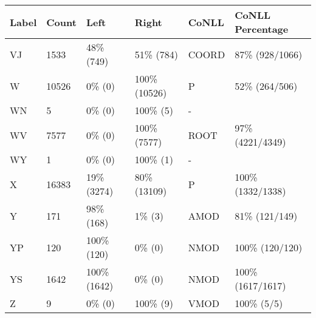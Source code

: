 \begin{figure*}
\begin{tabular}{|l|l|l|l||l|l|}
\hline
Label & Count & Left & Right & CoNLL & CoNLL Percentage\\ 
\hline
 VJ & 1533 & 48\% (749) & 51\% (784) & COORD & 87\% (928/1066) \\ 
\hline
 W & 10526 & 0\% (0) & 100\% (10526) & P & 52\% (264/506) \\ 
\hline
 WN & 5 & 0\% (0) & 100\% (5) & - &  \\ 
\hline
 WV & 7577 & 0\% (0) & 100\% (7577) & ROOT & 97\% (4221/4349) \\ 
\hline
 WY & 1 & 0\% (0) & 100\% (1) & - &  \\ 
\hline
 X & 16383 & 19\% (3274) & 80\% (13109) & P & 100\% (1332/1338) \\ 
\hline
 Y & 171 & 98\% (168) & 1\% (3) & AMOD & 81\% (121/149) \\ 
\hline
 YP & 120 & 100\% (120) & 0\% (0) & NMOD & 100\% (120/120) \\ 
\hline
 YS & 1642 & 100\% (1642) & 0\% (0) & NMOD & 100\% (1617/1617) \\ 
\hline
 Z & 9 & 0\% (0) & 100\% (9) & VMOD & 100\% (5/5) \\ 
\hline
\end{tabular}
\end{figure*}
